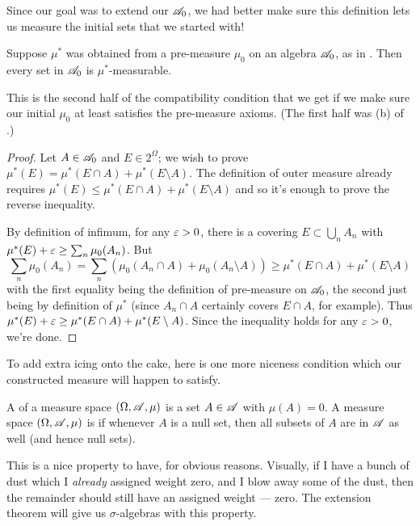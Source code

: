 Since our goal was to extend our $\mathscr A_0$,
we had better make sure this definition
lets us measure the initial sets that we started with!
\begin{proposition}
	\label{prop:cm_compatible}
	Suppose $\mu^\ast$ was obtained from a pre-measure $\mu_0$ on
	an algebra $\mathscr A_0$, as in .
	Then every set in $\mathscr A_0$ is $\mu^\ast$-measurable.
\end{proposition}
This is the second half of the compatibility condition
that we get if we make sure our initial $\mu_0$
at least satisfies the pre-measure axioms.
(The first half was (b) of .)
\begin{proof}
	Let $A \in \mathscr A_0$ and $E \in 2^{\Omega}$; we wish to prove
	$\mu^\ast(E) = \mu^\ast(E \cap A) + \mu^\ast(E \setminus A)$.
	The definition of outer measure already requires
	$\mu^\ast(E) \le \mu^\ast(E \cap A) + \mu^\ast(E \setminus A)$
	and so it's enough to prove the reverse inequality.

	By definition of infimum, for any $\varepsilon > 0$,
	there is a covering $E \subset \bigcup_n A_n$
	with $\mu^\ast(E) + \varepsilon \ge \sum_n \mu_0(A_n)$.
	But \[ \sum_n \mu_0(A_n)
		= \sum_n \left( \mu_0(A_n \cap A) + \mu_0(A_n \setminus A) \right)
		\ge \mu^\ast(E \cap A) + \mu^\ast(E \setminus A)  \]
	with the first equality being the definition of pre-measure
	on $\mathscr A_0$, the second just being by definition of $\mu^\ast$
	(since $A_n \cap A$ certainly covers $E \cap A$, for example).
	Thus $\mu^\ast(E) + \varepsilon \ge \mu^\ast(E \cap A) + \mu^\ast(E \setminus A)$.
	Since the inequality holds for any $\varepsilon > 0$, we're done.
\end{proof}

To add extra icing onto the cake,
here is one more niceness condition
which our constructed measure will happen to satisfy.
\begin{definition}
	A  of a measure space $(\Omega, \mathscr A, \mu)$
	is a set $A \in \mathscr A$ with $\mu(A) = 0$.
	A measure space $(\Omega, \mathscr A, \mu)$ is 
	if whenever $A$ is a null set,
	then all subsets of $A$ are in $\mathscr A$ as well (and hence null sets).
\end{definition}
This is a nice property to have, for obvious reasons.
Visually, if I have a bunch of dust which I \emph{already} assigned weight zero,
and I blow away some of the dust,
then the remainder should still have an assigned weight --- zero.
The extension theorem will give us $\sigma$-algebras with this property.

